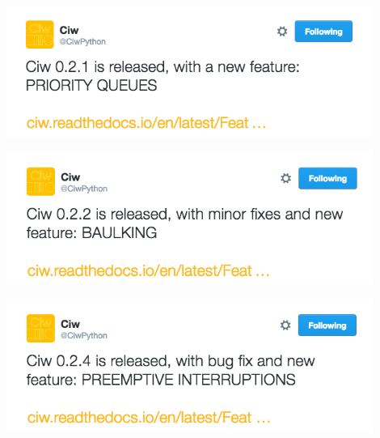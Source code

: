 \documentclass{beamer}
\begin{document}
\begin{frame}
  \begin{center}
  \href{https://twitter.com/CiwPython/status/748218828715360256}{\includegraphics[width=0.9\textwidth]{tweets/priority_queues}}
  \end{center}
\end{frame}
\begin{frame}
  \begin{center}
  \href{https://twitter.com/CiwPython/status/750753028450443264}{\includegraphics[width=0.9\textwidth]{tweets/baulking}}
  \end{center}
\end{frame}
\begin{frame}
  \begin{center}
  \href{https://twitter.com/CiwPython/status/780767974009430016}{\includegraphics[width=0.9\textwidth]{tweets/preemptive_interruptions}}
  \end{center}
\end{frame}
\end{document}
